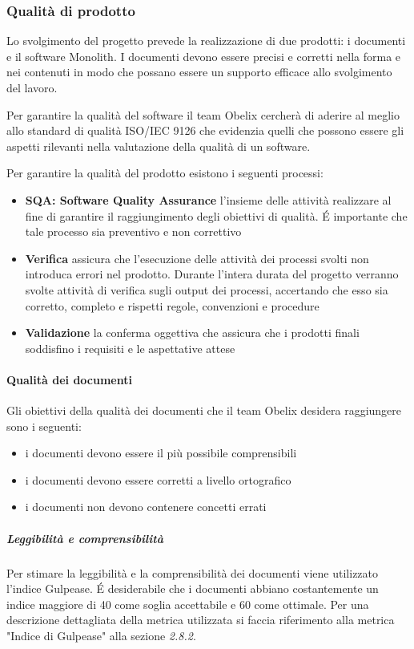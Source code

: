 \subsubsection{Qualità di prodotto}
Lo svolgimento del progetto prevede la realizzazione di due prodotti:
i documenti e il software Monolith.
I documenti devono essere precisi e corretti nella forma e nei
contenuti in modo che possano essere un supporto efficace allo
svolgimento del lavoro.

Per garantire la qualità del software il team Obelix cercherà
di aderire al meglio allo standard di qualità ISO/IEC 9126 che
evidenzia quelli che possono essere gli aspetti rilevanti nella
valutazione della qualità di un software.

Per garantire la qualità del prodotto esistono i seguenti processi:
\begin{itemize}
\item \textbf{SQA: Software Quality Assurance} l'insieme delle
  attività realizzare al fine di garantire il raggiungimento degli
  obiettivi di qualità. \'E importante che tale processo sia
  preventivo e non correttivo
\item \textbf{Verifica} assicura che l'esecuzione delle attività dei
  processi svolti non introduca errori
  nel prodotto. Durante l'intera durata del progetto verranno svolte
  attività di verifica sugli
  output dei processi, accertando che esso sia corretto, completo e
  rispetti regole, convenzioni
  e procedure
\item \textbf{Validazione} la conferma oggettiva che assicura che i prodotti finali soddisfino i requisiti
  e le aspettative attese
\end{itemize}

\paragraph{Qualità dei documenti}
Gli obiettivi della qualità dei documenti che il team Obelix desidera raggiungere sono i seguenti:
\begin{itemize}
\item i documenti devono essere il più possibile comprensibili
\item i documenti devono essere corretti a livello ortografico
\item i documenti non devono contenere concetti errati
\end{itemize}

\subparagraph{Leggibilità e comprensibilità}
Per stimare la leggibilità e la comprensibilità dei documenti
viene utilizzato l’indice Gulpease. \'E desiderabile che i documenti
abbiano costantemente un indice maggiore
di 40 come soglia accettabile e 60 come ottimale. Per una descrizione
dettagliata della metrica utilizzata si faccia riferimento
alla metrica "Indice di Gulpease" alla sezione
\emph{2.8.2}. %




